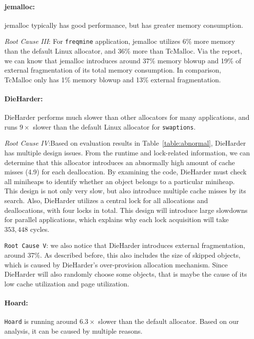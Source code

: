 \paragraph{jemalloc:} jemalloc typically has good performance, but has greater memory consumption.

\textit{Root Cause \RN{3}}: For \texttt{freqmine} application, jemalloc utilizes 6\% more memory than the default Linux allocator, and 36\% more than TcMalloc. Via the report, we can know that jemalloc introduces around 37\% memory blowup and 19\% of external fragmentation of its total memory consumption. In comparison, TcMalloc only has 1\% memory blowup and 13\% external fragmentation.  

\paragraph{DieHarder:} DieHarder performs much slower than other allocators for many applications, and runs $9\times$ slower than the default Linux allocator for \texttt{swaptions}.

\textit{Root Cause \RN{4}}:Based on evaluation results in Table~\ref{table:abnormal}, DieHarder has multiple design issues. From the runtime and lock-related information, we can determine that this allocator introduces an abnormally high amount of cache misses (4.9) for each deallocation. By examining the code, DieHarder must check all miniheaps to identify whether an object belongs to a particular miniheap. This design is not only very slow, but also introduce multiple cache misses by its search. Also, DieHarder utilizes a central lock for all allocations and deallocations, with four locks in total. This design will introduce large slowdowns for parallel applications, which explains why each lock acquisition will take $353,448$ cycles. 

\texttt{Root Cause \RN{5}}: we also notice that DieHarder introduces external fragmentation, around 37\%. As described before, this also includes the size of skipped objects, which is caused by DieHarder's over-provision allocation mechanism. Since DieHarder will also randomly choose some objects, that is maybe the cause of its low cache utilization and page utilization. 


\paragraph{Hoard:} 
 \texttt{Hoard} is running around $6.3\times$ slower than the default allocator. Based on our analysis, it can be caused by multiple reasons.
 
